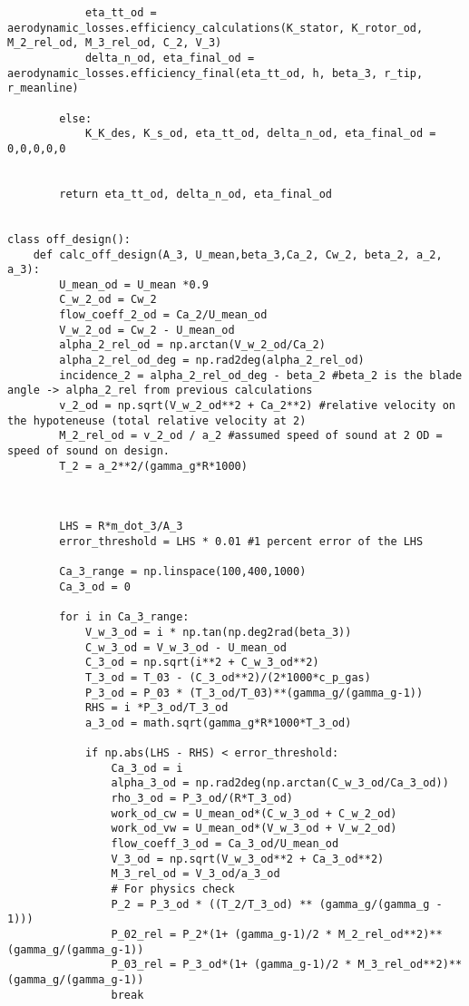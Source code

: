 \begin{verbatim}
            eta_tt_od = aerodynamic_losses.efficiency_calculations(K_stator, K_rotor_od, M_2_rel_od, M_3_rel_od, C_2, V_3)
            delta_n_od, eta_final_od = aerodynamic_losses.efficiency_final(eta_tt_od, h, beta_3, r_tip, r_meanline)

        else:
            K_K_des, K_s_od, eta_tt_od, delta_n_od, eta_final_od = 0,0,0,0,0

        
        return eta_tt_od, delta_n_od, eta_final_od


class off_design():   
    def calc_off_design(A_3, U_mean,beta_3,Ca_2, Cw_2, beta_2, a_2, a_3):
        U_mean_od = U_mean *0.9
        C_w_2_od = Cw_2
        flow_coeff_2_od = Ca_2/U_mean_od
        V_w_2_od = Cw_2 - U_mean_od
        alpha_2_rel_od = np.arctan(V_w_2_od/Ca_2)
        alpha_2_rel_od_deg = np.rad2deg(alpha_2_rel_od)
        incidence_2 = alpha_2_rel_od_deg - beta_2 #beta_2 is the blade angle -> alpha_2_rel from previous calculations
        v_2_od = np.sqrt(V_w_2_od**2 + Ca_2**2) #relative velocity on the hypoteneuse (total relative velocity at 2)
        M_2_rel_od = v_2_od / a_2 #assumed speed of sound at 2 OD = speed of sound on design.
        T_2 = a_2**2/(gamma_g*R*1000)



        LHS = R*m_dot_3/A_3
        error_threshold = LHS * 0.01 #1 percent error of the LHS

        Ca_3_range = np.linspace(100,400,1000)
        Ca_3_od = 0

        for i in Ca_3_range:
            V_w_3_od = i * np.tan(np.deg2rad(beta_3))
            C_w_3_od = V_w_3_od - U_mean_od
            C_3_od = np.sqrt(i**2 + C_w_3_od**2)
            T_3_od = T_03 - (C_3_od**2)/(2*1000*c_p_gas)
            P_3_od = P_03 * (T_3_od/T_03)**(gamma_g/(gamma_g-1))
            RHS = i *P_3_od/T_3_od
            a_3_od = math.sqrt(gamma_g*R*1000*T_3_od)

            if np.abs(LHS - RHS) < error_threshold:
                Ca_3_od = i
                alpha_3_od = np.rad2deg(np.arctan(C_w_3_od/Ca_3_od))
                rho_3_od = P_3_od/(R*T_3_od)
                work_od_cw = U_mean_od*(C_w_3_od + C_w_2_od)
                work_od_vw = U_mean_od*(V_w_3_od + V_w_2_od)
                flow_coeff_3_od = Ca_3_od/U_mean_od
                V_3_od = np.sqrt(V_w_3_od**2 + Ca_3_od**2)
                M_3_rel_od = V_3_od/a_3_od
                # For physics check
                P_2 = P_3_od * ((T_2/T_3_od) ** (gamma_g/(gamma_g - 1)))
                P_02_rel = P_2*(1+ (gamma_g-1)/2 * M_2_rel_od**2)**(gamma_g/(gamma_g-1))
                P_03_rel = P_3_od*(1+ (gamma_g-1)/2 * M_3_rel_od**2)**(gamma_g/(gamma_g-1))
                break


\end{verbatim}
